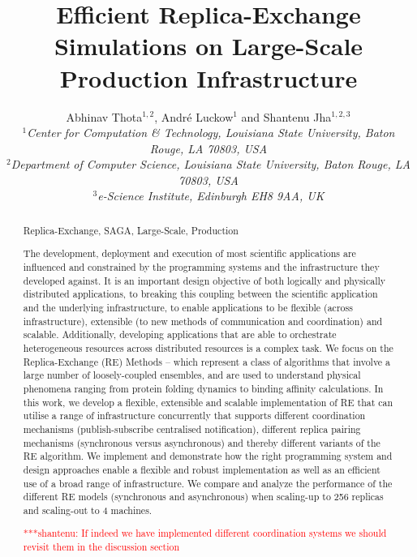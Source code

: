 \documentclass{rspublic}
\title[Efficient Replica-Exchange Simulations on
  Large-Scale Production Infrastructure]{Efficient Replica-Exchange Simulations on
  Large-Scale Production Infrastructure}
\author[Thota, Luckow, Jha]{
  Abhinav Thota$^{1,2}$, Andr\'e Luckow$^{1}$ and Shantenu Jha$^{1,2,3}$\\
  \small{\emph{$^{1}$Center for Computation \& Technology, Louisiana State University, Baton Rouge, LA 70803, USA}}\\
  \small{\emph{$^{2}$Department of Computer Science, Louisiana State
      University, Baton Rouge, LA 70803, USA}}\\
  \small{\emph{$^{3}$e-Science Institute, Edinburgh EH8 9AA, UK}}\\
}
\newcommand{\jhanote}[1]{ {\textcolor{red} { ***shantenu: #1 }}}
\newcommand{\jhanote}[1]{}
\begin{document}
 


\maketitle    

\begin{abstract}{Replica-Exchange, SAGA, Large-Scale, Production}  


  The development, deployment and execution of most scientific
  applications are influenced and constrained by the programming
  systems and the infrastructure they developed against.  It is an
  important design objective of both logically and physically
  distributed applications, to breaking this coupling between the
  scientific application and the underlying infrastructure, to enable
  applications to be flexible (across infrastructure), extensible (to
  new methods of communication and coordination) and scalable.
  Additionally, developing applications that are able to orchestrate
  heterogeneous resources across distributed resources is a complex
  task. We focus on the Replica-Exchange (RE) Methods -- which
  represent a class of algorithms that involve a large number of
  loosely-coupled ensembles, and are used to understand physical
  phenomena ranging from protein folding dynamics to binding affinity
  calculations.  In this work, we develop a flexible, extensible and
  scalable implementation of RE that can utilise a range of
  infrastructure concurrently that supports different coordination
  mechanisms (publish-subscribe centralised notification), different
  replica pairing mechanisms (synchronous versus asynchronous) and
  thereby different variants of the RE algorithm. We implement and
  demonstrate how the right programming system and design approaches
  enable a flexible and robust implementation as well as an efficient
  use of a broad range of infrastructure.  We compare and analyze the
  performance of the different RE models (synchronous and
  asynchronous) when scaling-up to 256 replicas and scaling-out to 4
  machines.

\jhanote{If indeed we have implemented different coordination systems
  we should revisit them in the discussion section}


\end{abstract}
\end{document}
